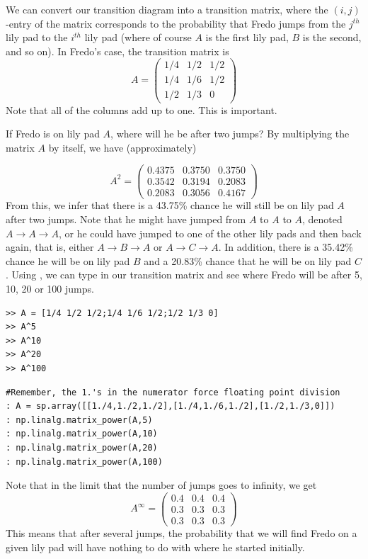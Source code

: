 We can convert our transition diagram into a transition matrix, where the $(i,j)$-entry of the matrix corresponds to the probability that Fredo jumps from the $j^{th}$ lily pad to the $i^{th}$ lily pad (where of course $A$ is the first lily pad, $B$ is the second, and so on).  In Fredo's case, the transition matrix is
\[
A = \begin{pmatrix}
1/4 & 1/2 & 1/2\\
1/4 & 1/6 & 1/2\\
1/2 & 1/3 & 0
\end{pmatrix}
\]
Note that all of the columns add up to one.  This is important.

If Fredo is on lily pad $A$, where will he be after two jumps?  By multiplying the matrix $A$ by itself, we have (approximately)

\[
A^2 = \begin{pmatrix}
0.4375 & 0.3750 & 0.3750\\
0.3542 & 0.3194 & 0.2083\\
0.2083 & 0.3056 & 0.4167
\end{pmatrix}
\]
From this, we infer that there is a 43.75\% chance he will still be on lily pad $A$ after two jumps.  Note that he might have jumped from $A$ to $A$ to $A$, denoted $A \rightarrow A \rightarrow A$, or he could have jumped to one of the other lily pads and then back again, that is, either $A \rightarrow B \rightarrow A$ or $A \rightarrow C \rightarrow A$.  In addition, there is a 35.42\% chance he will be on lily pad $B$ and a 20.83\% chance that he will be on lily pad $C$.  Using \ProgrammingLanguage, we can type in our transition matrix and see where Fredo will be after 5, 10, 20 or 100 jumps.

\begin{matlab}
\begin{lstlisting}[style=matlab]
>> A = [1/4 1/2 1/2;1/4 1/6 1/2;1/2 1/3 0]
>> A^5
>> A^10
>> A^20
>> A^100
\end{lstlisting}
\end{matlab}

\begin{python}
\begin{lstlisting}[style=python]
#Remember, the 1.'s in the numerator force floating point division
: A = sp.array([[1./4,1./2,1./2],[1./4,1./6,1./2],[1./2,1./3,0]])
: np.linalg.matrix_power(A,5)
: np.linalg.matrix_power(A,10)
: np.linalg.matrix_power(A,20)
: np.linalg.matrix_power(A,100)
\end{lstlisting}
\end{python}
Note that in the limit that the number of jumps goes to infinity, we get
\[
A^\infty = \begin{pmatrix}
0.4 & 0.4 & 0.4\\
0.3 & 0.3 & 0.3\\
0.3 & 0.3 & 0.3
\end{pmatrix}
\]
This means that after several jumps, the probability that we will find Fredo on a given lily pad will have nothing to do with where he started initially.
 
